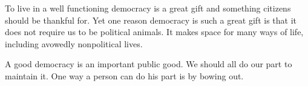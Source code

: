 \documentclass[letterpaper]{article}
\begin{document}
\bigskip 

\begin{mdframed}[]
    To live in a well functioning democracy is a great gift and something citizens should be thankful for. Yet one reason democracy is such a great gift is that it does not require us to be political animals. It makes space for many ways of life, including avowedly nonpolitical lives.
\end{mdframed}


\begin{mdframed}[]
    A good democracy is an important public good. We should all do our part to maintain it. One way a person can do his part is by bowing out.
\end{mdframed}
\end{document}
